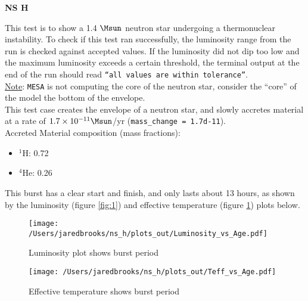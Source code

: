 \documentclass{article}
\begin{document}
	
	\begin{center}
		\begin{Large}
		       \textbf{NS H}\\
		\end{Large}
	\end{center}
	
        This test is to show a 1.4 $\Msun$ neutron star undergoing a thermonuclear instability.  To check if this test ran successfully, the luminosity range from the run is checked against accepted values.  If the luminosity did not dip too low and the maximum luminosity exceeds a certain threshold, the terminal output at the end of the run should read \texttt{``all values are within tolerance''}.\\

        \underline{Note}: \texttt{MESA} is not computing the core of the neutron star, consider the ``core'' of the model the bottom of the envelope.\\

        This test case creates the envelope of a neutron star, and slowly accretes material at a rate of $1.7\times10^{-11} \Msun$/yr (\texttt{mass\_change = 1.7d-11}).\\

        \noindent Accreted Material composition (mass fractions):
        \begin{itemize}
                \item $^1$H: 0.72
                \item $^4$He: 0.26
        \end{itemize}

        This burst has a clear start and finish, and only lasts about 13 hours, as shown by the luminosity (figure \ref{fig:1}) and effective temperature (figure \ref{fig:2}) plots below.

        \begin{figure}[H]
                \begin{minipage}[b]{0.5\linewidth}
		       \centering
		       \texttt{[image: /Users/jaredbrooks/ns\_h/plots\_out/Luminosity\_vs\_Age.pdf]}
		       \caption{Luminosity plot shows burst period}
		       \label{fig:1}
                \end{minipage}
                \hspace{0cm}
                \begin{minipage}[b]{0.5\linewidth}
                       \centering
                       \texttt{[image: /Users/jaredbrooks/ns\_h/plots\_out/Teff\_vs\_Age.pdf]}
                       \caption{Effective temperature shows burst period}
                       \label{fig:2}
                \end{minipage}
	\end{figure}
\end{document}
